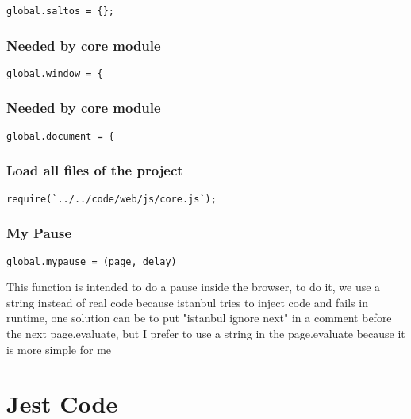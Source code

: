 \documentclass[a4paper]{article}
\begin{document}
\begin{lstlisting}
global.saltos = {};
\end{lstlisting}

\hypertarget{toc450}{}
\subsubsection{Needed by core module}

\begin{lstlisting}
global.window = {
\end{lstlisting}

\hypertarget{toc451}{}
\subsubsection{Needed by core module}

\begin{lstlisting}
global.document = {
\end{lstlisting}

\hypertarget{toc452}{}
\subsubsection{Load all files of the project}

\begin{lstlisting}
require(`../../code/web/js/core.js`);
\end{lstlisting}

\hypertarget{toc453}{}
\subsubsection{My Pause}

\begin{lstlisting}
global.mypause = (page, delay)
\end{lstlisting}

This function is intended to do a pause inside the browser, to do it, we
use a string instead of real code because istanbul tries to inject code
and fails in runtime, one solution can be to put "istanbul ignore next"
in a comment before the next page.evaluate, but I prefer to use a string
in the page.evaluate because it is more simple for me


\hypertarget{toc454}{}
\section{Jest Code}

\hypertarget{toc455}{}
\end{document}
